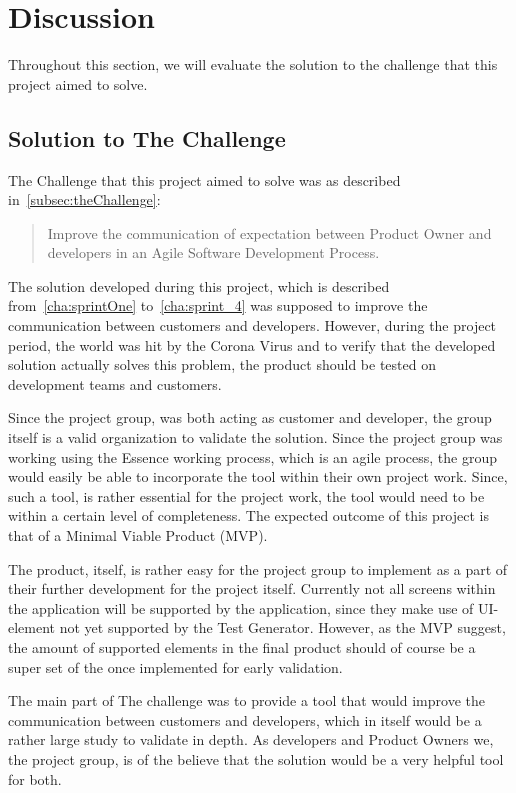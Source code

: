 \section{Discussion}

Throughout this section, we will evaluate the solution to the challenge that this project aimed to solve.

\subsection{Solution to The Challenge}

The Challenge that this project aimed to solve was as described in~\autoref{subsec:theChallenge}:

\begin{quote}
    Improve the communication of expectation between Product Owner and developers in an Agile Software Development Process.
\end{quote}

The solution developed during this project, which is described from~\autoref{cha:sprintOne} to~\autoref{cha:sprint_4} was supposed to improve the communication between customers and developers.
However, during the project period, the world was hit by the Corona Virus and to verify that the developed solution actually solves this problem, the product should be tested on development teams and customers.

Since the project group, was both acting as customer and developer, the group itself is a valid organization to validate the solution.
Since the project group was working using the Essence working process, which is an agile process, the group would easily be able to incorporate the tool within their own project work.
Since, such a tool, is rather essential for the project work, the tool would need to be within a certain level of completeness.
The expected outcome of this project is that of a Minimal Viable Product (MVP).

The product, itself, is rather easy for the project group to implement as a part of their further development for the project itself.
Currently not all screens within the application will be supported by the application, since they make use of UI-element not yet supported by the Test Generator.
However, as the MVP suggest, the amount of supported elements in the final product should of course be a super set of the once implemented for early validation.

The main part of The challenge was to provide a tool that would improve the communication between customers and developers, which in itself would be a rather large study to validate in depth.
As developers and Product Owners we, the project group, is of the believe that the solution would be a very helpful tool for both.

